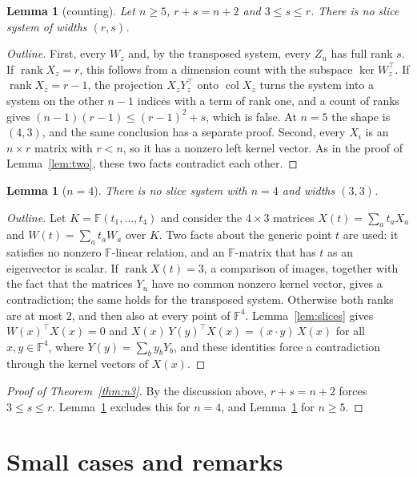 \documentclass[11pt]{amsart}
\newtheorem{lemma}[theorem]{Lemma}
\theoremstyle{remark}
\newcommand{\F}{\mathbb{F}}
\newcommand{\rk}{\operatorname{rank}}
\newcommand{\col}{\operatorname{col}}
\begin{document}
\begin{lemma}[counting]\label{lem:count}
Let $n\ge5$, $r+s=n+2$ and $3\le s\le r$. There is no slice system of widths $(r,s)$.
\end{lemma}

\begin{proof}[Outline]
First, every $W_z$ and, by the transposed system, every $Z_u$ has full rank $s$. If $\rk X_z=r$, this
follows from a dimension count with the subspace $\ker W_z^{\top}$. If $\rk X_z=r-1$, the projection
$X_zY_z^{\top}$ onto $\col X_z$ turns the system into a system on the other $n-1$ indices with a term of rank
one, and a count of ranks gives $(n-1)(r-1)\le(r-1)^2+s$, which is false. At $n=5$ the shape is $(4,3)$, and
the same conclusion has a separate proof. Second, every $X_i$ is an $n\times r$ matrix with $r<n$, so it has
a nonzero left kernel vector. As in the proof of Lemma~\ref{lem:two}, these two facts contradict each other.
\end{proof}

\begin{lemma}[$n=4$]\label{lem:four}
There is no slice system with $n=4$ and widths $(3,3)$.
\end{lemma}

\begin{proof}[Outline]
Let $K=\F(t_1,\dots,t_4)$ and consider the $4\times3$ matrices $X(t)=\sum_at_aX_a$ and $W(t)=\sum_at_aW_a$
over $K$. Two facts about the generic point $t$ are used: it satisfies no nonzero $\F$-linear relation, and
an $\F$-matrix that has $t$ as an eigenvector is scalar. If $\rk X(t)=3$, a comparison of images, together
with the fact that the matrices $Y_u$ have no common nonzero kernel vector, gives a contradiction; the same
holds for the transposed system. Otherwise both ranks are at most $2$, and then also at every point of
$\F^4$. Lemma~\ref{lem:slices} gives $W(x)^{\top}X(x)=0$ and $X(x)\,Y(y)^{\top}X(x)=(x\cdot y)\,X(x)$ for all
$x,y\in\F^4$, where $Y(y)=\sum_by_bY_b$, and these identities force a contradiction through the kernel
vectors of $X(x)$.
\end{proof}

\begin{proof}[Proof of Theorem~\ref{thm:n3}]
By the discussion above, $r+s=n+2$ forces $3\le s\le r$. Lemma~\ref{lem:four} excludes this for $n=4$, and
Lemma~\ref{lem:count} for $n\ge5$.
\end{proof}

\section{Small cases and remarks}\label{sec:small}
\end{document}
